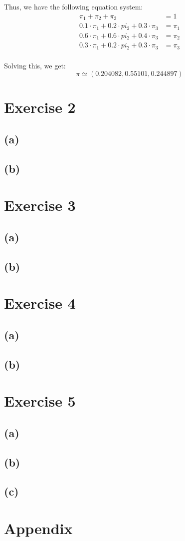 \documentclass[12pt]{article}
\begin{document}
Thus, we have the following equation system:
\begin{align*}
	\pi_1 + \pi_2 + \pi_3 &= 1 \\
	0.1 \cdot \pi_1 + 0.2 \cdot pi_2 + 0.3 \cdot \pi_3 &= \pi_1 \\
	0.6 \cdot \pi_1 + 0.6 \cdot pi_2 + 0.4 \cdot \pi_3 &= \pi_2 \\
	0.3 \cdot \pi_1 + 0.2 \cdot pi_2 + 0.3 \cdot \pi_3 &= \pi_3 \\
\end{align*}

Solving this, we get:
\begin{equation*}
	\pi \simeq \left(0.204082, 0.55101, 0.244897 \right)
\end{equation*}

\section*{Exercise 2}
\subsection*{(a)}
\subsection*{(b)}

\section*{Exercise 3}
\subsection*{(a)}
\subsection*{(b)}

\section*{Exercise 4}
\subsection*{(a)}
\subsection*{(b)}

\section*{Exercise 5}
\subsection*{(a)}
\subsection*{(b)}
\subsection*{(c)}


\section*{Appendix}\label{appendix}
\end{document}
